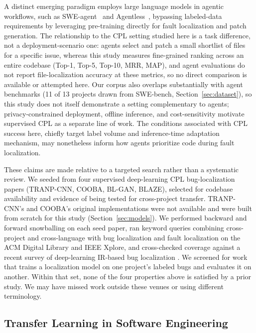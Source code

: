 \documentclass[a4paper,fleqn]{cas-dc}
\begin{document}
A distinct emerging paradigm employs large language models in agentic
workflows, such as SWE-agent~\citep{yang2024sweagent} and
Agentless~\citep{xia2024agentless,zhang2024autocoderover,hossain2024deepdive},
bypassing labeled-data requirements by leveraging pre-training directly for
fault localization and patch generation. The relationship to the CPL setting studied here is a task difference, not
a deployment-scenario one: agents select and patch a small shortlist of
files for a specific issue, whereas this study measures fine-grained
ranking across an entire codebase (Top-1, Top-5, Top-10, MRR, MAP), and
agent evaluations do not report file-localization accuracy at these
metrics, so no direct comparison is available or attempted here. Our
corpus also overlaps substantially with agent benchmarks (11 of 13
projects drawn from SWE-bench, Section~\ref{sec:dataset}), so this study
does not itself demonstrate a setting complementary to agents;
privacy-constrained deployment, offline inference, and cost-sensitivity
motivate supervised CPL as a separate line of work. The conditions
associated with CPL success here, chiefly target label volume and
inference-time adaptation mechanism, may nonetheless inform how agents
prioritize code during fault localization.

These claims are made relative to a targeted search rather than a systematic
review. We seeded from four supervised deep-learning CPL bug-localization
papers (TRANP-CNN, COOBA, BL-GAN, BLAZE), selected for codebase availability
and evidence of being tested for cross-project transfer. TRANP-CNN's and
COOBA's original implementations were not available and were built from
scratch for this study (Section~\ref{sec:models}). We performed backward and
forward snowballing on each seed paper, ran keyword queries combining
cross-project and cross-language with bug localization and fault localization
on the ACM Digital Library and IEEE Xplore, and cross-checked coverage against
a recent survey of deep-learning IR-based bug localization
\citep{niu2025deep}. We screened for work that trains a localization model on
one project's labeled bugs and evaluates it on another. Within that set, none
of the four properties above is satisfied by a prior study. We may have
missed work outside these venues or using different terminology.

\subsection{Transfer Learning in Software Engineering}
\end{document}
